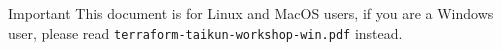 \begin{warn}{Important}
  This document is for Linux and MacOS users, if you are a Windows user, please read \texttt{terraform-taikun-workshop-win.pdf} instead.
\end{warn}
